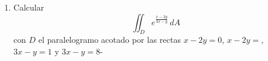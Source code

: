 \documentclass{article}
\begin{document}
\begin{enumerate}
        \item {
            Calcular
            \[
                \iint_{D}{e^{\frac{x-2y}{3x-y}}\,dA}
            \]
            con $D$ el paralelogramo acotado por las rectas $x-2y=0$, $x-2y=$,
            $3x-y=1$ y $3x-y=8$-

            \color{azul}

            


}
\end{enumerate}
\end{document}
